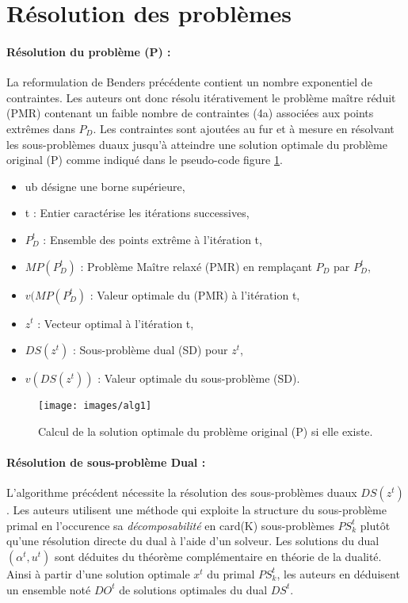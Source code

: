 \section{Résolution des problèmes}

\paragraph{Résolution du problème (P) :}La reformulation de Benders précédente contient un nombre exponentiel de contraintes. Les auteurs ont donc résolu itérativement le problème maître réduit (PMR) contenant un faible nombre de contraintes (4a) associées aux points extrêmes dans $P_D$. Les contraintes sont ajoutées au fur et à mesure en résolvant les sous-problèmes duaux jusqu'à atteindre une solution optimale du problème original (P) comme indiqué dans le pseudo-code  figure \ref{alg1}.

\begin{itemize}
	\item ub désigne une borne supérieure,
	\item t : Entier caractérise les itérations successives,
	\item $P^t_D$ : Ensemble des points extrême à l'itération t, 
	\item  $MP(P^t_D)$ : Problème Maître relaxé (PMR) en remplaçant $P_D$ par $P^t_D$,
	\item $v(MP(P^t_D)$ : Valeur optimale du (PMR) à l'itération t,
	\item $z^t$ : Vecteur optimal à l'itération t,
	\item $DS(z^t)$ : Sous-problème dual (SD) pour $z^t$,
	\item $v(DS(z^t))$ : Valeur optimale du sous-problème (SD).
\end{itemize}

\begin{figure}[H]
	\begin{center}	
		\texttt{[image: images/alg1]}
		\caption{Calcul de la solution optimale du problème original (P) si elle existe.}
		\label{alg1}
	\end{center}
\end{figure}


  \paragraph{Résolution de sous-problème Dual :}

L'algorithme précédent nécessite la résolution des sous-problèmes duaux $DS(z^t)$. Les auteurs utilisent une méthode qui exploite la structure du sous-problème primal en l'occurence sa \textit{décomposabilité} en card(K) sous-problèmes $PS^t_k $ plutôt qu'une résolution directe du dual à l'aide d'un solveur. Les solutions du dual $(\alpha^t, u^t)$ sont déduites du théorème complémentaire en théorie de la dualité. Ainsi à partir d'une solution optimale $x^t$ du primal $PS^t_k$, les auteurs en déduisent un ensemble noté $DO^t$ de solutions optimales du dual $DS^t$.

